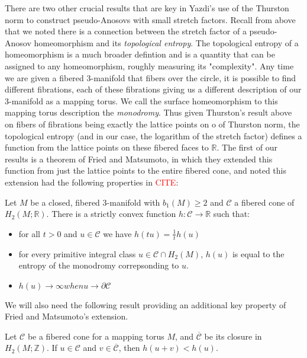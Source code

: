 There are two other crucial results that are key in Yazdi's use of the Thurston norm to construct pseudo-Anosovs with small stretch factors. Recall from above that we noted there is a connection between the stretch factor of a pseudo-Anosov homeomorphism and its \textit{topological entropy}. The topological entropy of a homeomorphism is a much broader defintion and is a quantity that can be assigned to any homeomorphism, roughly measuring its "complexity". Any time we are given a fibered 3-manifold that fibers over the circle, it is possible to find different fibrations, each of these fibrations giving us a different description of our 3-manifold as a mapping torus. We call the surface homeomorphism to this mapping torus description the \textit{monodromy}. Thus given Thurston's result above on fibers of fibrations being exactly the lattice points on o of Thurston norm, the topological entropy (and in our case, the logarithm of the stretch factor) defines a function from the lattice points on these fibered faces to $\mathbb{R}$. The first of our results is a theorem of Fried and Matsumoto, in which they extended this function from just the lattice points to the entire fibered cone, and noted this extension had the following properties in \textcolor{red}{CITE}:

\begin{thm}
Let $M$ be a closed, fibered 3-manifold with $b_1(M) \geq 2$ and $\mathcal{C}$ a fibered cone of $H_2(M;\mathbb{R})$. There is a strictly convex function $h: \mathcal{C} \xrightarrow{} \mathbb{R}$ such that:
\begin{itemize}
    \item for all $t > 0$ and $u \in \mathcal{C}$ we have $h(tu) = \frac{1}{t}h(u)$
    \item for every primitive integral class $u \in \mathcal{C} \cap H_2(M)$, $h(u)$ is equal to the entropy of the monodromy correpsonding to $u$.
    \item $h(u) \xrightarrow{} \infty when u \xrightarrow{} \partial\mathcal{C}$
\end{itemize}
\end{thm}

We will also need the following result providing an additional key property of Fried and Matsumoto's extension.

\begin{prop}
Let $\mathcal{C}$ be a fibered cone for a mapping torus $M$, and $\overline{\mathcal{C}}$ be its closure in $H_2(M;\mathbb{Z})$. If $u \in \mathcal{C}$ and $v \in \overline{\mathcal{C}}$, then $h(u + v) < h(u)$.
\end{prop}

